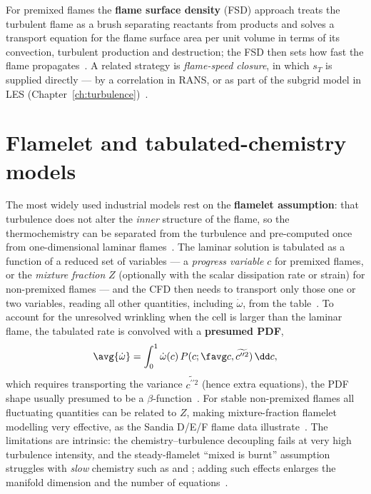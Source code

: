 For premixed flames the \textbf{flame surface density} (FSD) approach treats the turbulent flame as a brush separating reactants from products and solves a transport equation for the flame surface area per unit volume in terms of its convection, turbulent production and destruction; the FSD then sets how fast the flame propagates~\cite{lecture10,veynante2002turbulent}. A related strategy is \emph{flame-speed closure}, in which $s_T$ is supplied directly --- by a correlation in RANS, or as part of the subgrid model in LES (Chapter~\ref{ch:turbulence})~\cite{lecture10}.

\section{Flamelet and tabulated-chemistry models}

The most widely used industrial models rest on the \textbf{flamelet assumption}: that turbulence does not alter the \emph{inner} structure of the flame, so the thermochemistry can be separated from the turbulence and pre-computed once from one-dimensional laminar flames~\cite{lecture10,veynante2002turbulent,peters2000turbulent}. The laminar solution is tabulated as a function of a reduced set of variables --- a \emph{progress variable} $c$ for premixed flames, or the \emph{mixture fraction} $Z$ (optionally with the scalar dissipation rate or strain) for non-premixed flames --- and the CFD then needs to transport only those one or two variables, reading all other quantities, including $\dot\omega$, from the table~\cite{lecture10}. To account for the unresolved wrinkling when the cell is larger than the laminar flame, the tabulated rate is convolved with a \textbf{presumed PDF},
\begin{equation}
\avg{\dot\omega}=\int_0^1\dot\omega(c)\,P(c;\favg c,\widetilde{c^{\prime\prime 2}})\,\dd c,
\label{eq:presumed-pdf}
\end{equation}
which requires transporting the variance $\widetilde{c^{\prime\prime 2}}$ (hence extra equations), the PDF shape usually presumed to be a $\beta$-function~\cite{lecture10,veynante2002turbulent}. For stable non-premixed flames all fluctuating quantities can be related to $Z$, making mixture-fraction flamelet modelling very effective, as the Sandia D/E/F flame data illustrate~\cite{lecture10}. The limitations are intrinsic: the chemistry--turbulence decoupling fails at very high turbulence intensity, and the steady-flamelet ``mixed is burnt'' assumption struggles with \emph{slow} chemistry such as  and ; adding such effects enlarges the manifold dimension and the number of equations~\cite{lecture10}.

